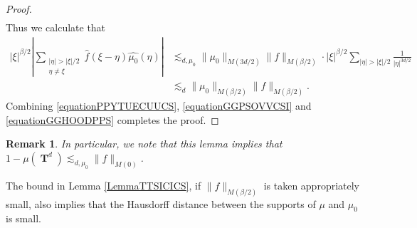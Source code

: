 \documentclass[12pt,reqno]{article}
\numberwithin{equation}{section}
\DeclareMathOperator{\TT}{\mathbf{T}}
\newtheorem{remark}[theorem]{Remark}
\numberwithin{theorem}{section}
\begin{document}
\begin{proof}
\begin{equation}
\begin{split}
    \end{split}
    \end{equation}
    Thus we calculate that
    \begin{equation} \label{equationGGHOODPPS}
    \begin{split}
        |\xi|^{\beta/2} \left| \sum_{\substack{|\eta| > |\xi|/2\\ \eta \neq \xi}} \widehat{f}(\xi - \eta) \widehat{\mu_0}(\eta) \right| &\lesssim_{d,\mu_0} \| \mu_0 \|_{M(3d/2)} \| f \|_{M(\beta/2)} \cdot |\xi|^{\beta/2} \sum_{|\eta| > |\xi|/2} \frac{1}{|\eta|^{3d/2}}\\
        &\lesssim_d \| \mu_0 \|_{M(\beta/2)} \| f \|_{M(\beta/2)}.
    \end{split}
    \end{equation}
    Combining \eqref{equationPPYTUECUUCS}, \eqref{equationGGPSOVVCSI} and \eqref{equationGGHOODPPS} completes the proof.
\end{proof}

\begin{remark} \label{remarkFOIJIOSJCIOSJ}
    In particular, we note that this lemma implies that $1 - \mu(\TT^d) \lesssim_{d,\mu_0} \| f \|_{M(0)}$.
\end{remark}

The bound in Lemma \ref{LemmaTTSICICS}, if $\| f \|_{M(\beta/2)}$ is taken appropriately small, also implies that the Hausdorff distance between the supports of $\mu$ and $\mu_0$ is small.
\end{document}
